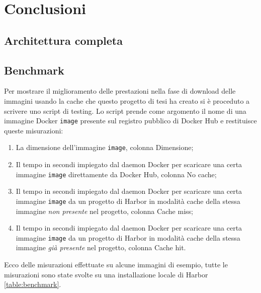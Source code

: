 \documentclass[12pt,a4paper]{report}
\begin{document}
\chapter{Conclusioni}
\section{Architettura completa}

\section{Benchmark}
Per mostrare il miglioramento delle prestazioni nella fase di download delle immagini usando la cache che questo progetto di tesi ha creato si è proceduto a scrivere uno script di testing. Lo script prende come argomento il nome di una immagine Docker \texttt{image} presente sul registro pubblico di Docker Hub e restituisce queste misurazioni:
\begin{enumerate}
    \item La dimensione dell'immagine \texttt{image}, colonna Dimensione;
    \item Il tempo in secondi impiegato dal daemon Docker per scaricare una certa immagine \texttt{image} direttamente da Docker Hub, colonna No cache;
    \item Il tempo in secondi impiegato dal daemon Docker per scaricare una certa immagine \texttt{image} da un progetto di Harbor in modalità cache della stessa immagine \textit{non presente} nel progetto, colonna Cache miss;
    \item Il tempo in secondi impiegato dal daemon Docker per scaricare una certa immagine \texttt{image} da un progetto di Harbor in modalità cache della stessa immagine \textit{già presente} nel progetto, colonna Cache hit.
\end{enumerate}
Ecco delle misurazioni effettuate su alcune immagini di esempio, tutte le misurazioni sono state svolte su una installazione locale di Harbor \ref{table:benchmark}.
\end{document}

